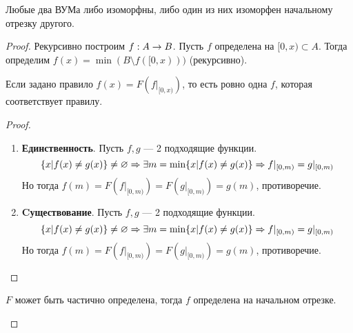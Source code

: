 \begin{theorem}
    Любые два ВУМа либо изоморфны, либо один из них изоморфен начальному отрезку другого.
\end{theorem}
\begin{proof}
    Рекурсивно построим \(f: A \rightarrow B\). Пусть \(f\) определена на \([0, x) \subset A\). Тогда определим \(f(x) = \min(B \setminus f([0, x)))\) (рекурсивно). 
    \begin{theorem}
        Если задано правило \(f(x) = F(f|_{[0, x)})\), то есть ровно одна \(f\), которая соответствует правилу.
    \end{theorem}
    \begin{proof}\indent
        \begin{enumerate}
            \item[] \textbf{Единственность}. Пусть \(f, g\) --- 2 подходящие функции.
            \[\{x | f(x) \ne g(x)\} \ne \varnothing \Rightarrow \exists m = \min\{x| f(x) \ne g(x)\} \Rightarrow f|_{[0, m)} = g|_{[0, m)}\]
            Но тогда \(f(m) = F(f|_{[0, m)}) = F(g|_{[0, m)}) = g(m)\), противоречие.

            \item[] \textbf{Cуществование}. Пусть \(f, g\) --- 2 подходящие функции.
            \[\{x | f(x) \ne g(x)\} \ne \varnothing \Rightarrow \exists m = \min\{x| f(x) \ne g(x)\} \Rightarrow f|_{[0, m)} = g|_{[0, m)}\]
            Но тогда \(f(m) = F(f|_{[0, m)}) = F(g|_{[0, m)}) = g(m)\), противоречие.
        \end{enumerate}
    \end{proof}
    \begin{theorem}
        \(F\) может быть частично определена, тогда \(f\) определена на начальном отрезке.
    \end{theorem}
\end{proof}